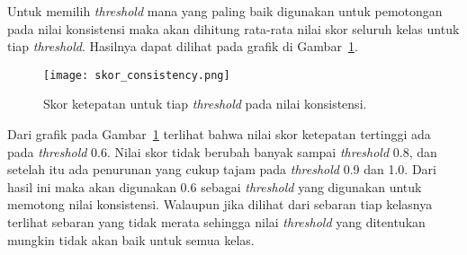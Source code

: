 Untuk memilih \textit{threshold} mana yang paling baik digunakan untuk pemotongan pada nilai konsistensi maka akan dihitung rata-rata nilai skor seluruh kelas untuk tiap \textit{threshold}. Hasilnya dapat dilihat pada grafik di Gambar~\ref{fig:skor_consistency}. 
\begin{figure}[H]
	\centering
	\texttt{[image: skor\_consistency.png]}
	\caption{Skor ketepatan untuk tiap \textit{threshold} pada nilai konsistensi.}
	\label{fig:skor_consistency}
\end{figure}
Dari grafik pada Gambar~\ref{fig:skor_consistency} terlihat bahwa nilai skor ketepatan tertinggi ada pada \textit{threshold} 0.6. Nilai skor tidak berubah banyak sampai \textit{threshold} 0.8, dan setelah itu ada penurunan yang cukup tajam pada \textit{threshold} 0.9 dan 1.0. Dari hasil ini maka akan digunakan 0.6 sebagai \textit{threshold} yang digunakan untuk memotong nilai konsistensi. Walaupun jika dilihat dari sebaran tiap kelasnya terlihat sebaran yang tidak merata sehingga nilai \textit{threshold} yang ditentukan mungkin tidak akan baik untuk semua kelas.

